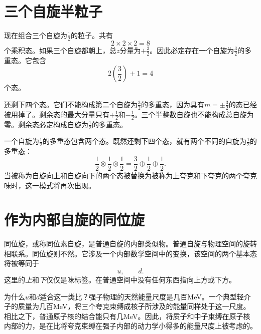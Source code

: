 \begin{classroomqa}
\end{classroomqa}

\section{三个自旋半粒子}

现在组合三个自旋为\(\tfrac12\)的粒子。共有
\begin{equation}
2\times2\times2=8
\end{equation}
个乘积态。如果三个自旋都朝上，总\(z\)分量为\(+\tfrac32\)。因此必定存在一个自旋为\(\tfrac32\)的多重态。它包含
\begin{equation}
2\left(\frac32\right)+1=4
\end{equation}
个态。

还剩下四个态。它们不能构成第二个自旋为\(\tfrac32\)的多重态，因为具有\(m=\pm\tfrac32\)的态已经被用掉了。剩余态的最大分量只有\(+\tfrac12\)和\(-\tfrac12\)。三个半整数自旋也不能构成总自旋为零。剩余态必定构成自旋为\(\tfrac12\)的多重态。

一个自旋为\(\tfrac12\)的多重态包含两个态。既然还剩下四个态，就有两个不同的自旋为\(\tfrac12\)的多重态：
\begin{equation}
\frac12\otimes\frac12\otimes\frac12
=
\frac32\oplus\frac12\oplus\frac12.
\end{equation}
当被称为自旋向上和自旋向下的两个态被替换为被称为上夸克和下夸克的两个夸克味时，这一模式将再次出现。

\section{作为内部自旋的同位旋}

同位旋，或称同位素自旋，是普通自旋的内部类似物。普通自旋与物理空间的旋转相联系。同位旋则不然。它涉及一个内部数学空间中的变换，该空间的两个基本态将被等同于
\begin{equation}
u,\qquad d.
\end{equation}
这里的\emph{上}和\emph{下}仅仅是味标签。在普通空间中没有任何东西指向上方或下方。


为什么\(u\)和\(d\)适合这一类比？强子物理的天然能量尺度是几百MeV。一个典型轻介子的质量为几百MeV，将三个夸克束缚成核子所涉及的能量同样处于这一尺度。相比之下，普通原子核的结合能只有几MeV。因此，将质子和中子束缚在原子核内部的力，是在比将夸克束缚在强子内部的动力学小得多的能量尺度上被考虑的。

